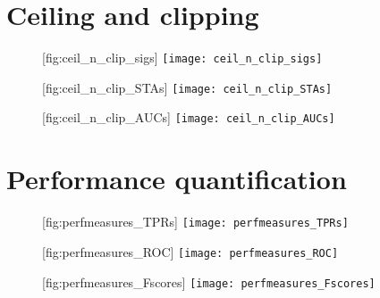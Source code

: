\section{Ceiling and clipping}

\begin{figure}
    \begin{sidecaption}
        {}
        [fig:ceil_n_clip_sigs]
        \texttt{[image: ceil\_n\_clip\_sigs]}
    \end{sidecaption}
\end{figure}

\begin{figure}
    \begin{sidecaption}
        {}
        [fig:ceil_n_clip_STAs]
        \texttt{[image: ceil\_n\_clip\_STAs]}
    \end{sidecaption}
\end{figure}

\begin{figure}
    \begin{sidecaption}
        {}
        [fig:ceil_n_clip_AUCs]
        \texttt{[image: ceil\_n\_clip\_AUCs]}
    \end{sidecaption}
\end{figure}


\section{Performance quantification}

\begin{figure}
    \begin{sidecaption}
        {}
        [fig:perfmeasures_TPRs]
        \texttt{[image: perfmeasures\_TPRs]}
    \end{sidecaption}
\end{figure}

\begin{figure}
    \begin{sidecaption}
        {}
        [fig:perfmeasures_ROC]
        \texttt{[image: perfmeasures\_ROC]}
    \end{sidecaption}
\end{figure}

\begin{figure}
    \begin{sidecaption}
        {}
        [fig:perfmeasures_Fscores]
        \texttt{[image: perfmeasures\_Fscores]}
    \end{sidecaption}
\end{figure}

